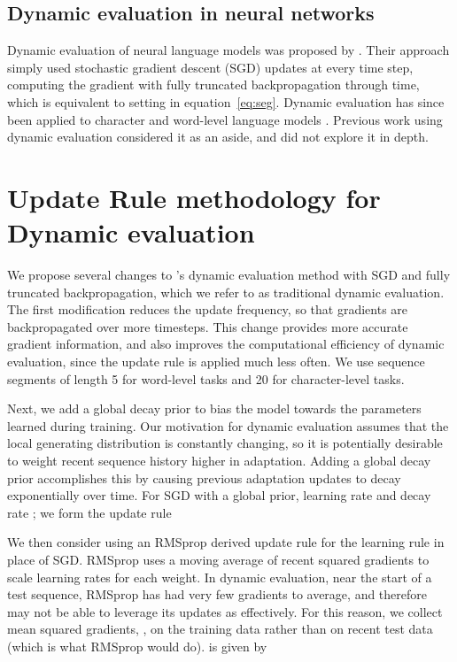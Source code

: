 \documentclass{article} \usepackage{iclr2018_conference,times}
\begin{document}
\subsection{Dynamic evaluation in neural networks}

Dynamic evaluation of neural language models was proposed by \citet{mikolov2010}. Their approach simply used stochastic gradient descent (SGD) updates at every time step, computing the gradient with fully truncated backpropagation through time, which is equivalent to setting  in equation~\eqref{eq:seg}. Dynamic evaluation has since been applied to character and word-level language models \citep{Graves-2013,krause2017,ororbia2017,fortunato2017}. Previous work using dynamic evaluation considered it as an aside, and did not explore it in depth.




\section{Update Rule methodology for Dynamic evaluation}
\label{sec:updaterule}


We propose several changes to \citet{mikolov2010}'s dynamic evaluation method with SGD and fully truncated backpropagation, which we refer to as traditional dynamic evaluation. The first modification reduces the update frequency, so that gradients are backpropagated over more timesteps. This change provides more accurate gradient information, and also improves the computational efficiency of dynamic evaluation, since the update rule is applied much less often. We use sequence segments of length 5 for word-level tasks and 20 for character-level tasks. 

Next, we add a global decay prior to bias the model towards the parameters  learned during training. Our motivation for dynamic evaluation assumes that the local generating distribution  is constantly changing, so it is potentially desirable to weight recent sequence history higher in adaptation. Adding a global decay prior accomplishes this by causing previous adaptation updates to decay exponentially over time. For SGD with a global prior, learning rate  and decay rate ; we form the update rule





We then consider using an RMSprop \citep{tieleman2012} derived update rule for the learning rule in place of SGD\@. RMSprop uses a moving average of recent squared gradients to scale learning rates for each weight. In dynamic evaluation, near the start of a test sequence, RMSprop has had very few gradients to average, and therefore may not be able to leverage its updates as effectively. For this reason, we collect mean squared gradients, , on the training data rather than on recent test data (which is what RMSprop would do).  is given by
\end{document}
